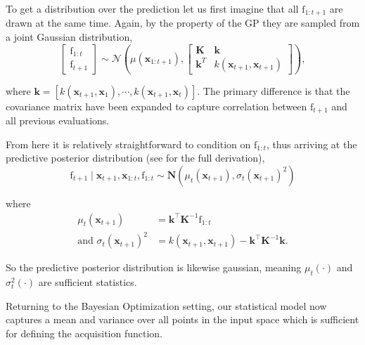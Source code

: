 \documentclass[conference,compsoc]{IEEEtran}
\theoremstyle{definition}
\begin{document}
            To get a distribution over the prediction let us first imagine that all $\bm{\mathrm{f}}_{1:t+1}$ are drawn at the same time.
            Again, by the property of the GP they are sampled from a joint Gaussian distribution,
            \begin{equation} 
                \begin{bmatrix}\bm{\mathrm{f}}_{1:t}\\\mathrm{f}_{t+1}\end{bmatrix} \sim \mathcal{N}(\mu(\bm{x}_{1:t+1}),
                \begin{bmatrix}
                \bm{K}&\bm{k}\\
                \bm{k}^T&k(\bm{x}_{t+1},\bm{x}_{t+1})
                \end{bmatrix}
                ),
            \end{equation}
            
            \noindent where $\bm{k} = [k(\bm{x}_{t+1}, \bm{x}_1), \cdots, k(\bm{x}_{t+1}, \bm{x}_t)]$. 
            The primary difference is that the covariance matrix have been expanded to capture correlation between $\mathrm{f}_{t+1}$ and all previous evaluations.

            From here it is relatively straightforward to condition on $\bm{\mathrm{f}}_{1:t}$, thus arriving at the predictive posterior distribution (see \parencite[A.2]{rasmussen_gaussian_2006} for the full derivation),
            \begin{equation}\label{eq:gppred}%
                \mathrm{f}_{t+1}\mid \bm{x}_{t+1},\bm{x}_{1:t},\bm{\mathrm{f}}_{1:t} \sim \bm{N}(\mu_t(\bm{x}_{t+1}),\sigma_t(\bm{x}_{t+1})^2)  
            \end{equation}

            where 
            \begin{align}
                \mu_t(\bm{x}_{t+1})          &= \bm{k}^\top\bm{K}^{-1}\bm{\mathrm{f}}_{1:t} \\
                \text{and }\sigma_t(\bm{x}_{t+1})^2 &= k(\bm{x}_{t+1}, \bm{x}_{t+1}) − \bm{k}^\top \bm{K}^{-1}\bm{k}.
            \end{align}

            \noindent So the predictive posterior distribution is likewise gaussian, meaning $\mu_t(\cdot)$ and $\sigma_t^2(\cdot)$ are sufficient statistics.
            
            Returning to the Bayesian Optimization setting, our statistical model now captures a mean and variance over all points in the input space which is sufficient for defining the acquisition function. %
\end{document}
